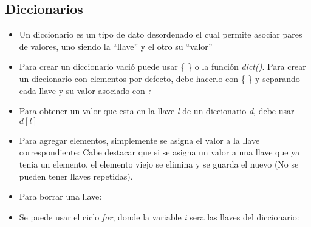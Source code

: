 \subsection*{Diccionarios}

\begin{itemize}
    \item Un diccionario es un tipo de dato desordenado el cual permite asociar pares de valores, uno siendo la ``llave'' y el otro su ``valor''
    
    \item Para crear un diccionario vació puede usar \{ \} o la función \textit{dict()}. Para crear un diccionario con elementos por defecto, debe hacerlo con \{ \} y separando cada llave y su valor asociado con \textit{:}
    
    
    \item Para obtener un valor que esta en la llave \textit{l} de un diccionario \textit{d}, debe usar $d[l]$
    
    \item Para agregar elementos, simplemente se asigna el valor a la llave correspondiente:
    Cabe destacar que si se asigna un valor a una llave que ya tenia un elemento, el elemento viejo se elimina y se guarda el nuevo (No se pueden tener llaves repetidas).
    
    \item Para borrar una llave:
    
    \item Se puede usar el ciclo \textit{for}, donde la variable \textit{i} sera las llaves del diccionario:
    

\end{itemize}
